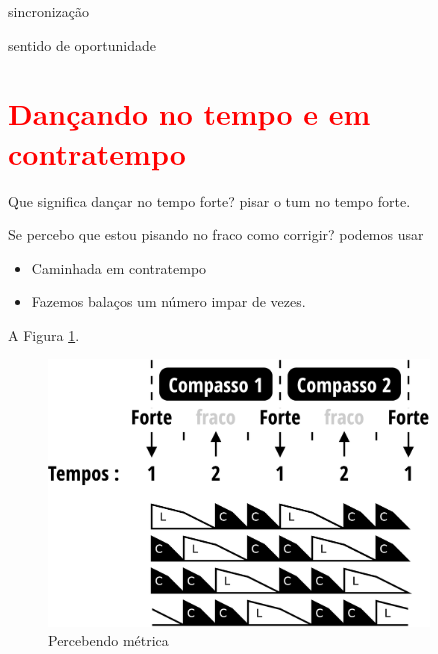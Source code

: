  sincronização 

 sentido de oportunidade 


\section{\textcolor{red}{Dançando no tempo e em contratempo}}


Que significa dançar no tempo forte? 
pisar o tum  no tempo forte.

Se percebo que estou pisando no fraco como corrigir?
podemos usar
\begin{itemize}
\item Caminhada em contratempo
\item Fazemos balaços um número impar de vezes.
\end{itemize}


A Figura \ref{fig:tempovscontratempo}.

\begin{figure}[h]
    \centering 
\includegraphics[width=0.9\textwidth]{chapters/cap-musica-musicalidade/bailarcontratempo.eps}
    \caption{Percebendo métrica}\label{fig:tempovscontratempo}
\end{figure}


